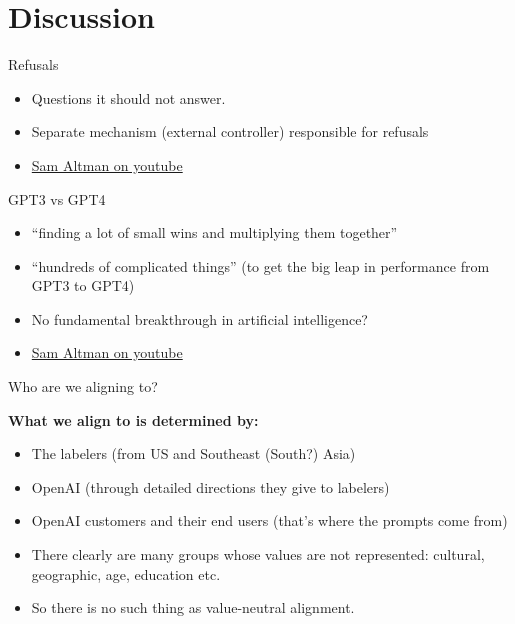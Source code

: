 


\section{Discussion}





\begin{vbframe}{Refusals}

\vfill

\begin{itemize}
	\item Questions it should not answer.
\item Separate mechanism (external controller) responsible for refusals
	\item \href{https://www.youtube.com/watch?v=L_Guz73e6fw}{Sam
	Altman on youtube}
\end{itemize}

\vfill

\end{vbframe}


\begin{vbframe}{GPT3 vs GPT4}

\vfill

\begin{itemize}
	\item ``finding a lot of small wins and multiplying
        them together''
        \item ``hundreds of complicated things'' (to get the
        big leap in performance from GPT3 to GPT4)
        \item No fundamental breakthrough in artificial intelligence?
	\item \href{https://www.youtube.com/watch?v=L_Guz73e6fw}{Sam
	Altman on youtube}
\end{itemize}

\vfill

\end{vbframe}



\begin{vbframe}{Who are we aligning to?}

\vfill

\textbf{What we align to is determined by:}

	\begin{itemize}
		\item The labelers (from US and Southeast
		(South?) Asia)
		\item OpenAI (through detailed directions
		they give to labelers)
		\item OpenAI customers and their end users
		(that's where the prompts come from)
                \item There clearly are many groups whose
		values are not represented: cultural,
		geographic, age, education etc.
                \item So there is no such thing as
		value-neutral alignment.
	\end{itemize}

\vfill

\end{vbframe}

